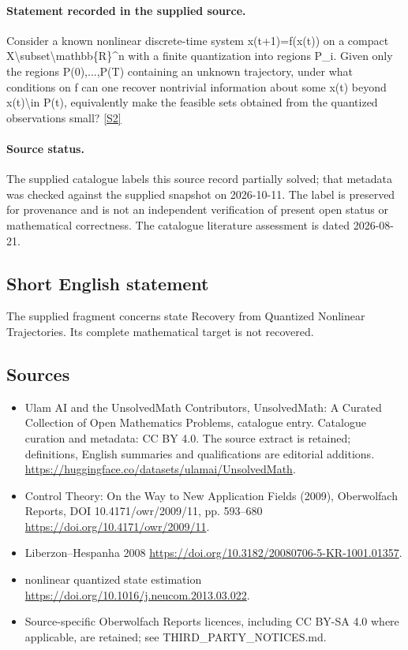 \documentclass[11pt]{article}
\newcommand{\sref}[2]{\hyperlink{source:#1:#2}{[S#2]}}
\begin{document}
\paragraph{Statement recorded in the supplied source.}
Consider a known nonlinear discrete-time system x(t+1)=f(x(t)) on a compact X\textbackslash{}subset\textbackslash{}mathbb\{R\}\textasciicircum{}n with a finite quantization into regions P\_i. Given only the regions P(0),...,P(T) containing an unknown trajectory, under what conditions on f can one recover nontrivial information about some x(t) beyond x(t)\textbackslash{}in P(t), equivalently make the feasible sets obtained from the quantized observations small? \sref{statement}{2}
\paragraph{Source status.}
The supplied catalogue labels this source record partially solved; that metadata was checked against the supplied snapshot on 2026-10-11. The label is preserved for provenance and is not an independent verification of present open status or mathematical correctness. The catalogue literature assessment is dated 2026-08-21.
\subsection{Short English statement}
The supplied fragment concerns state Recovery from Quantized Nonlinear Trajectories. Its complete mathematical target is not recovered.
\subsection{Sources}
\begin{itemize}
\item[\hypertarget{source:statement:1}{S1}] Ulam AI and the UnsolvedMath Contributors, UnsolvedMath: A Curated Collection of Open Mathematics Problems, catalogue entry. Catalogue curation and metadata: CC BY 4.0. The source extract is retained; definitions, English summaries and qualifications are editorial additions.
\url{https://huggingface.co/datasets/ulamai/UnsolvedMath}.
\item[\hypertarget{source:statement:2}{S2}] Control Theory: On the Way to New Application Fields (2009), Oberwolfach Reports, DOI 10.4171/owr/2009/11, pp. 593--680
\url{https://doi.org/10.4171/owr/2009/11}.
\item[\hypertarget{source:statement:3}{S3}] Liberzon--Hespanha 2008
\url{https://doi.org/10.3182/20080706-5-KR-1001.01357}.
\item[\hypertarget{source:statement:4}{S4}] nonlinear quantized state estimation
\url{https://doi.org/10.1016/j.neucom.2013.03.022}.
\item Source-specific Oberwolfach Reports licences, including CC BY-SA 4.0 where applicable, are retained; see THIRD\_PARTY\_NOTICES.md.
\end{itemize}
\end{document}
